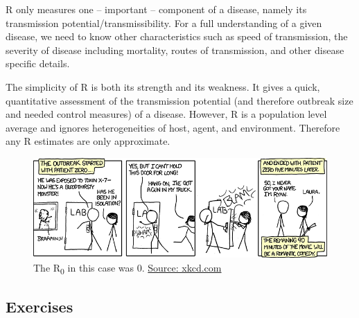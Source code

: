 \documentclass[]{article}
\theoremstyle{definition}
\theoremstyle{definition}
\theoremstyle{definition}
\theoremstyle{remark}
\begin{document}
R only measures one -- important -- component of a disease, namely its
transmission potential/transmissibility. For a full understanding of a
given disease, we need to know other characteristics such as speed of
transmission, the severity of disease including mortality, routes of
transmission, and other disease specific details.

The simplicity of R is both its strength and its weakness. It gives a
quick, quantitative assessment of the transmission potential (and
therefore outbreak size and needed control measures) of a disease.
However, R is a population level average and ignores heterogeneities of
host, agent, and environment. Therefore any R estimates are only
approximate.

\begin{figure}
\centering
\includegraphics{./images/xkcd-outbreak-control.png}
\caption{The R\textsubscript{0} in this case was 0.
\href{https://xkcd.com/734/}{Source: xkcd.com}}
\end{figure}

\subsection{Exercises}\label{exercises-3}
\end{document}
